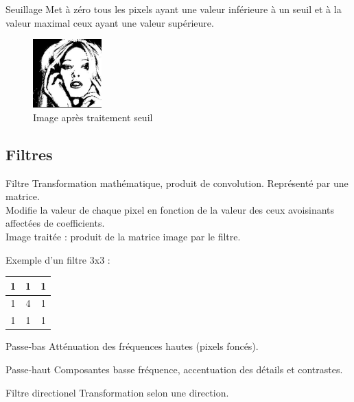 \documentclass[14pt]{beamer}
\begin{document}
\begin{frame}{\subsecname}
\begin{block}{Seuillage}
Met à zéro tous les pixels ayant une valeur inférieure à un seuil et à la valeur maximal ceux ayant une valeur supérieure.\\
\end{block}
\begin{figure}
\centering
\includegraphics[width=100px]{image_femme_seuil}
\caption{Image après traitement seuil}
\end{figure}
\end{frame}



\subsection{Filtres}

\begin{frame}[allowframebreaks]{\subsecname}

\begin{block}{Filtre}
Transformation mathématique, produit de convolution. Représenté par une matrice.\\
Modifie la valeur de chaque pixel en fonction de la valeur des ceux avoisinants affectées de coefficients.\\
Image traitée : produit de la matrice image par le filtre.
\end{block}

Exemple d'un filtre 3x3 :
\begin{table}[h]
\centering
\begin{tabular}{|c|c|c|}
 \hline
 1 & 1 & 1 \\
 \hline
 1 & 4 & 1 \\
 \hline
 1 & 1 & 1 \\
 \hline
\end{tabular}
\end{table}

\begin{block}{Passe-bas}
Atténuation des fréquences hautes (pixels foncés).
\end{block}
\begin{block}{Passe-haut}
Composantes basse fréquence, accentuation des détails et contrastes.
\end{block}
\begin{block}{Filtre directionel} 
Transformation selon une direction.
\end{block}

\end{frame}
\end{document}
